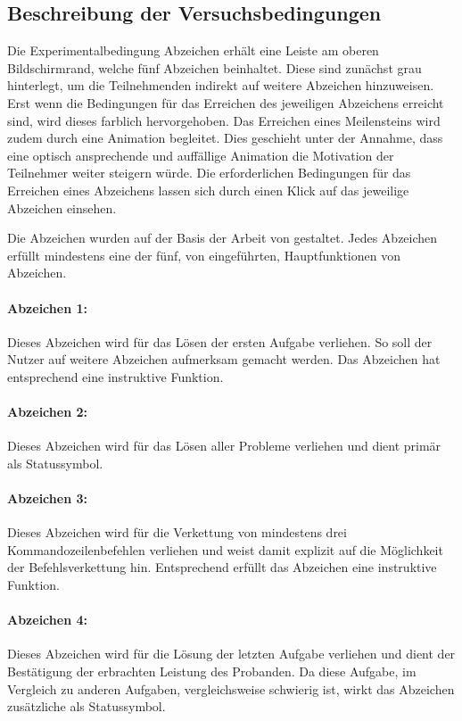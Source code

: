 \subsection{Beschreibung der Versuchsbedingungen}
Die Experimentalbedingung Abzeichen erhält eine Leiste am oberen Bildschirmrand, welche fünf Abzeichen beinhaltet. Diese sind zunächst grau hinterlegt, um die Teilnehmenden indirekt auf weitere Abzeichen hinzuweisen. Erst wenn die Bedingungen für das Erreichen des jeweiligen Abzeichens erreicht sind, wird dieses farblich hervorgehoben. Das Erreichen eines Meilensteins wird zudem durch eine Animation begleitet. Dies geschieht unter der Annahme, dass eine optisch ansprechende und auffällige Animation die Motivation der Teilnehmer weiter steigern würde. Die erforderlichen Bedingungen für das Erreichen eines Abzeichens lassen sich durch einen Klick auf das jeweilige Abzeichen einsehen.

Die Abzeichen wurden auf der Basis der Arbeit von  gestaltet. Jedes Abzeichen erfüllt mindestens eine der fünf, von  eingeführten, Hauptfunktionen von Abzeichen.

\paragraph{Abzeichen 1:}
Dieses Abzeichen wird für das Lösen der ersten Aufgabe verliehen. So soll der Nutzer auf weitere Abzeichen aufmerksam gemacht werden. Das Abzeichen hat entsprechend eine instruktive Funktion.

\paragraph{Abzeichen 2:}
Dieses Abzeichen wird für das Lösen aller Probleme verliehen und dient primär als Statussymbol.

\paragraph{Abzeichen 3:}
Dieses Abzeichen wird für die Verkettung von mindestens drei Kommandozeilenbefehlen verliehen und weist damit explizit auf die Möglichkeit der Befehlsverkettung hin. Entsprechend erfüllt das Abzeichen eine instruktive Funktion.

\paragraph{Abzeichen 4:}
Dieses Abzeichen wird für die Lösung der letzten Aufgabe verliehen und dient der Bestätigung der erbrachten Leistung des Probanden. Da diese Aufgabe, im Vergleich zu anderen Aufgaben, vergleichsweise schwierig ist, wirkt das Abzeichen zusätzliche als Statussymbol.


